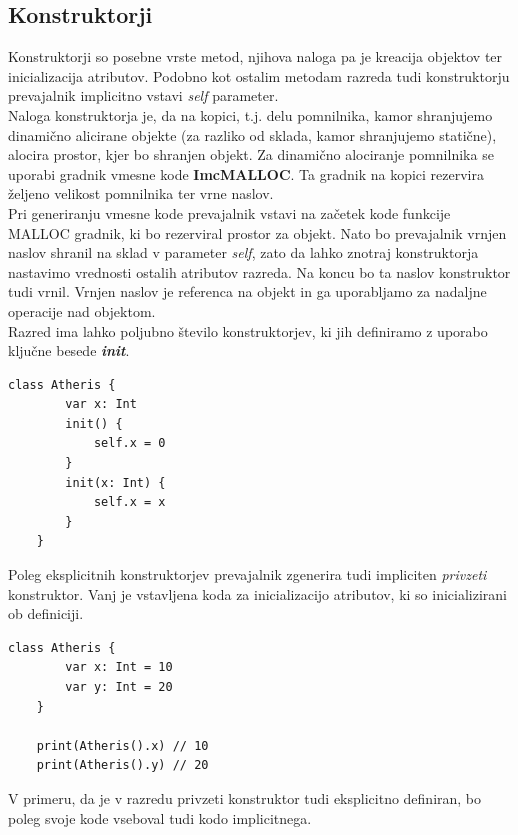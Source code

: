 \documentclass[a4paper, 12pt]{book}
\begin{document}
\subsection{Konstruktorji}

Konstruktorji so posebne vrste metod, njihova naloga pa je kreacija objektov ter inicializacija atributov. Podobno kot ostalim metodam razreda tudi konstruktorju prevajalnik implicitno vstavi \textit{self} parameter. \\
\indent Naloga konstruktorja je, da na kopici, t.j. delu pomnilnika, kamor shranjujemo dinamično alicirane objekte (za razliko od sklada, kamor shranjujemo statične), alocira prostor, kjer bo shranjen objekt. Za dinamično alociranje pomnilnika se uporabi gradnik vmesne kode \textbf{ImcMALLOC}. Ta gradnik na kopici rezervira željeno velikost pomnilnika ter vrne naslov. \\
\indent Pri generiranju vmesne kode prevajalnik vstavi na začetek kode funkcije MALLOC gradnik, ki bo rezerviral prostor za objekt. Nato bo prevajalnik vrnjen naslov shranil na sklad v parameter \textit{self}, zato da lahko znotraj konstruktorja nastavimo vrednosti ostalih atributov razreda. Na koncu bo ta naslov konstruktor tudi vrnil. Vrnjen naslov je referenca na objekt in ga uporabljamo za nadaljne operacije nad objektom. \\
\indent Razred ima lahko poljubno število konstruktorjev, ki jih definiramo z uporabo ključne besede \textit{\textbf{init}}. 
\newpage

\begin{lstlisting}[caption={Konsturktorji}, captionpos=b]
	class Atheris {
	    var x: Int
	    init() {
	        self.x = 0
	    }
	    init(x: Int) {
	        self.x = x
	    }
	}
\end{lstlisting}

\indent Poleg eksplicitnih konstruktorjev prevajalnik zgenerira tudi impliciten \textit{privzeti} konstruktor. Vanj je vstavljena koda za inicializacijo atributov, ki so inicializirani ob definiciji. 

\begin{lstlisting}[caption={Implicitni privzeti konstruktor}, captionpos=b]
	class Atheris {
	    var x: Int = 10
	    var y: Int = 20
	}
	
	print(Atheris().x) // 10
	print(Atheris().y) // 20
\end{lstlisting}

V primeru, da je v razredu privzeti konstruktor tudi eksplicitno definiran, bo poleg svoje kode vseboval tudi kodo implicitnega.
\newpage
\end{document}

